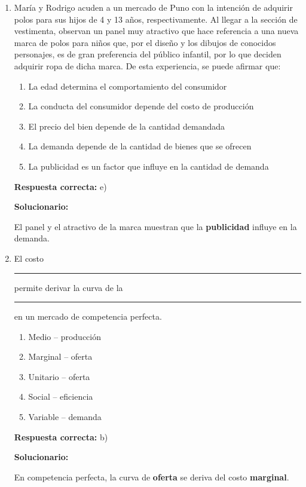 \begin{enumerate}[resume]

	
	\item María y Rodrigo acuden a un mercado de Puno con la intención de adquirir polos para sus hijos de 4 y 13 años, respectivamente. Al llegar a la sección de vestimenta, observan un panel muy atractivo que hace referencia a una nueva marca de polos para niños que, por el diseño y los dibujos de conocidos personajes, es de gran preferencia del público infantil, por lo que deciden adquirir ropa de dicha marca. De esta experiencia, se puede afirmar que:
	\begin{enumerate}[label=\alph*)]
		\item La edad determina el comportamiento del consumidor
		\item La conducta del consumidor depende del costo de producción
		\item El precio del bien depende de la cantidad demandada
		\item La demanda depende de la cantidad de bienes que se ofrecen
		\item La publicidad es un factor que influye en la cantidad de demanda
	\end{enumerate}
	\textbf{Respuesta correcta:} e)
	
	\vspace{2mm}
	\textbf{Solucionario:}
	
	El panel y el atractivo de la marca muestran que la \textbf{publicidad} influye en la demanda.
	
	\vspace{6mm}
	
	\item El costo \rule{2cm}{0.4pt} permite derivar la curva de la \rule{2cm}{0.4pt} en un mercado de competencia perfecta.
	\begin{enumerate}[label=\alph*)]
		\item Medio – producción
		\item Marginal – oferta
		\item Unitario – oferta
		\item Social – eficiencia
		\item Variable – demanda
	\end{enumerate}
	\textbf{Respuesta correcta:} b)
	
	\vspace{2mm}
	\textbf{Solucionario:}
	
	En competencia perfecta, la curva de \textbf{oferta} se deriva del costo \textbf{marginal}.
	

\end{enumerate}
